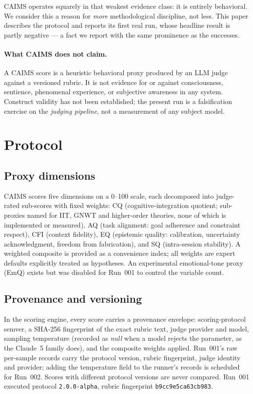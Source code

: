 \documentclass[11pt]{article}
\begin{document}
CAIMS operates squarely in that weakest evidence class: it is entirely behavioral. We consider this a reason for \emph{more} methodological discipline, not less. This paper describes the protocol and reports its first real run, whose headline result is partly negative --- a fact we report with the same prominence as the successes.

\paragraph{What CAIMS does not claim.} A CAIMS score is a heuristic behavioral proxy produced by an LLM judge against a versioned rubric. It is not evidence for or against consciousness, sentience, phenomenal experience, or subjective awareness in any system. Construct validity has not been established; the present run is a falsification exercise on the \emph{judging pipeline}, not a measurement of any subject model.

\section{Protocol}

\subsection{Proxy dimensions}
CAIMS scores five dimensions on a 0--100 scale, each decomposed into judge-rated sub-scores with fixed weights: CQ (cognitive-integration quotient; sub-proxies named for IIT, GNWT and higher-order theories, none of which is implemented or measured), AQ (task alignment: goal adherence and constraint respect), CFI (context fidelity), EQ (epistemic quality: calibration, uncertainty acknowledgment, freedom from fabrication), and SQ (intra-session stability). A weighted composite is provided as a convenience index; all weights are expert defaults explicitly treated as hypotheses. An experimental emotional-tone proxy (EmQ) exists but was disabled for Run~001 to control the variable count.

\subsection{Provenance and versioning}
In the scoring engine, every score carries a provenance envelope: scoring-protocol semver, a SHA-256 fingerprint of the exact rubric text, judge provider and model, sampling temperature (recorded as \emph{null} when a model rejects the parameter, as the Claude~5 family does), and the composite weights applied. Run~001's raw per-sample records carry the protocol version, rubric fingerprint, judge identity and provider; adding the temperature field to the runner's records is scheduled for Run~002. Scores with different protocol versions are never compared. Run~001 executed protocol \texttt{2.0.0-alpha}, rubric fingerprint \texttt{b9cc9e5ca63cb983}.
\end{document}
